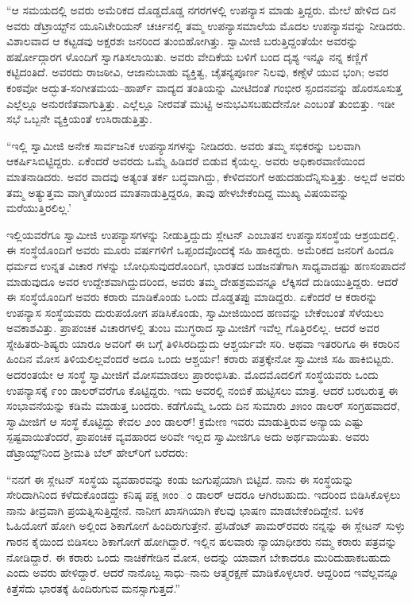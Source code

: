 “ಆ ಸಮಯದಲ್ಲಿ ಅವರು ಅಮೆರಿಕದ ದೊಡ್ಡದೊಡ್ಡ ನಗರಗಳಲ್ಲಿ ಉಪನ್ಯಾಸ ಮಾಡು ತ್ತಿದ್ದರು. ಮೇಲೆ ಹೇಳಿದ ದಿನ ಅವರು ಡೆಟ್ರಾಯ್ಟ್​ನ ಯೂನಿಟೇರಿಯನ್ ಚರ್ಚಿನಲ್ಲಿ ತಮ್ಮ ಉಪನ್ಯಾಸಮಾಲೆಯ ಮೊದಲ ಉಪನ್ಯಾಸವನ್ನು ನೀಡಿದರು. ವಿಶಾಲವಾದ ಆ ಕಟ್ಟಡವು ಅಕ್ಷರಶಃ ಜನರಿಂದ ತುಂಬಿಹೋಗಿತ್ತು. ಸ್ವಾಮೀಜಿ ಬರುತ್ತಿದ್ದಂತೆಯೇ ಅವರನ್ನು ಹರ್ಷೋದ್ಗಾರಗ ಳೊಂದಿಗೆ ಸ್ವಾಗತಿಸಲಾಯಿತು. ಅವರು ವೇದಿಕೆಯ ಬಳಿಗೆ ಬಂದ ದೃಶ್ಯ ಇನ್ನೂ ನನ್ನ ಕಣ್ಣಿಗೆ ಕಟ್ಟಿದಂತಿದೆ. ಅವರದು ರಾಜಠೀವಿ, ಆಜಾನುಬಾಹು ವ್ಯಕ್ತಿತ್ವ, ಚೈತನ್ಯಪೂರ್ಣ ನಿಲವು, ಕಣ್ಸೆಳೆ ಯುವ ಭಂಗಿ; ಅವರ ಕಂಠವೋ ಅದ್ಭುತ-ಸಂಗೀತಮಯ–ಹಾರ್ಪ್ ವಾದ್ಯದ ತಂತಿಯನ್ನು ಮೀಟಿದಂತೆ ಗಂಭೀರ ಸ್ಪಂದನವನ್ನು ಹೊರಸೂಸುತ್ತ ಎಲ್ಲೆಲ್ಲೂ ಅನುರಣಿತವಾಗುತ್ತಿತ್ತು. ಎಲ್ಲೆಲ್ಲೂ ನೀರವತೆ ಮುಟ್ಟಿ ಅನುಭವಿಸಬಹುದೇನೋ ಎಂಬಂತೆ ತುಂಬಿತ್ತು. ಇಡೀ ಸಭೆ ಒಬ್ಬನೇ ವ್ಯಕ್ತಿಯಂತೆ ಉಸಿರಾಡುತ್ತಿತ್ತು.

“ಇಲ್ಲಿ ಸ್ವಾಮೀಜಿ ಅನೇಕ ಸಾರ್ವಜನಿಕ ಉಪನ್ಯಾಸಗಳನ್ನು ನೀಡಿದರು. ಅವರು ತಮ್ಮ ಸಭಿಕರನ್ನು ಬಲವಾಗಿ ಆಕರ್ಷಿಸಿಬಿಟ್ಟಿದ್ದರು. ಏಕೆಂದರೆ ಅವರದು ಒಮ್ಮೆ ಹಿಡಿದರೆ ಬಿಡುವ ಕೈಯಲ್ಲ. ಅವರು ಅಧಿಕಾರವಾಣಿಯಿಂದ ಮಾತನಾಡಿದರು. ಅವರ ವಾದವು ಅತ್ಯಂತ ತರ್ಕ ಬದ್ಧವಾಗಿದ್ದು, ಕೇಳಿದವರಿಗೆ ಅಹುದಹುದೆನ್ನಿಸುತ್ತಿತ್ತು. ಅಲ್ಲದೆ ಅವರು ತಮ್ಮ ಅತ್ಯುತ್ತಮ ವಾಗ್ಮಿತೆಯಿಂದ ಮಾತನಾಡುತ್ತಿದ್ದರೂ, ತಾವು ಹೇಳಬೇಕೆಂದಿದ್ದ ಮುಖ್ಯ ವಿಷಯವನ್ನು ಮರೆಯುತ್ತಿರಲಿಲ್ಲ.’

ಇಲ್ಲಿಯವರೆಗೂ ಸ್ವಾಮೀಜಿ ಉಪನ್ಯಾಸಗಳನ್ನು ನೀಡುತ್ತಿದ್ದುದು ಸ್ಲೇಟನ್ ಎಂಬಾತನ ಉಪನ್ಯಾಸಸಂಸ್ಥೆಯ ಆಶ್ರಯದಲ್ಲಿ. ಈ ಸಂಸ್ಥೆಯೊಂದಿಗೆ ಅವರು ಮೂರು ವರ್ಷಗಳಿಗೆ ಒಪ್ಪಂದವೊಂದಕ್ಕೆ ಸಹಿ ಹಾಕಿದ್ದರು. ಅಮೆರಿಕದ ಜನರಿಗೆ ಹಿಂದೂ ಧರ್ಮದ ಉನ್ನತ ವಿಚಾರ ಗಳನ್ನು ಬೋಧಿಸುವುದರೊಂದಿಗೆ, ಭಾರತದ ಬಡಜನತೆಗಾಗಿ ಸಾಧ್ಯವಾದಷ್ಟು ಹಣಸಂಪಾದನೆ ಮಾಡುವುದೂ ಅವರ ಉದ್ದೇಶವಾಗಿದ್ದುದರಿಂದ, ಅವರು ತಮ್ಮ ದೇಹಶ್ರಮವನ್ನೂ ಲೆಕ್ಕಿಸದೆ ದುಡಿಯುತ್ತಿದ್ದರು. ಆದರೆ ಈ ಸಂಸ್ಥೆಯೊಂದಿಗೆ ಅವರು ಕರಾರು ಮಾಡಿಕೊಂಡು ಒಂದು ದೊಡ್ಡತಪ್ಪು ಮಾಡಿದ್ದರು. ಏಕೆಂದರೆ ಆ ಕರಾರನ್ನು ಉಪನ್ಯಾಸ ಸಂಸ್ಥೆಯವರು ದುರುಪಯೋಗ ಪಡಿಸಿಕೊಂಡು, ಸ್ವಾಮೀಜಿಯಿಂದ ಹಣವನ್ನು ಬೇಕೆಂಬಂತೆ ಸೆಳೆಯಲು ಅವಕಾಶವಿತ್ತು. ಪ್ರಾಪಂಚಿಕ ವಿಚಾರಗಳಲ್ಲಿ ತುಂಬ ಮುಗ್ಧರಾದ ಸ್ವಾಮೀಜಿಗೆ ಇವೆಲ್ಲ ಗೊತ್ತಿರಲಿಲ್ಲ. ಆದರೆ ಅವರ ಸ್ನೇಹಿತರು-ಶಿಷ್ಯರು ಯಾರೂ ಅವರಿಗೆ ಈ ಬಗ್ಗೆ ತಿಳಿಸಿರದಿದ್ದುದು ಆಶ್ಚರ್ಯವೇ ಸರಿ. ಅಥವಾ ಇತರರಿಗೂ ಈ ಕರಾರಿನ ಹಿಂದಿನ ಮೋಸ ತಿಳಿಯಲಿಲ್ಲವೆಂದರೆ ಅದೂ ಒಂದು ಆಶ್ಚರ್ಯ! ಕರಾರು ಪತ್ರಕ್ಕೇನೋ ಸ್ವಾಮೀಜಿ ಸಹಿ ಹಾಕಿಬಿಟ್ಟರು. ಅದರಂತಯೇ ಆ ಸಂಸ್ಥೆ ಸ್ವಾಮೀಜಿಗೆ ಮೋಸಮಾಡಲು ಪ್ರಾರಂಭಿಸಿತು. ಮೊದಮೊದಲಿಗೆ ಸಂಸ್ಥೆಯವರು ಒಂದು ಉಪನ್ಯಾಸಕ್ಕೆ ೯ಂಂ ಡಾಲರ್​ವರೆಗೂ ಕೊಟ್ಟಿದ್ದರು. ಇದು ಅವರಲ್ಲಿ ನಂಬಿಕೆ ಹುಟ್ಟಿಸಲು ಮಾತ್ರ. ಆದರೆ ಬರಬರುತ್ತ ಈ ಸಂಭಾವನೆಯನ್ನು ಕಡಿಮೆ ಮಾಡುತ್ತ ಬಂದರು. ಕಡೆಗೊಮ್ಮೆ ಒಂದು ದಿನ ಸುಮಾರು ೨೫ಂಂ ಡಾಲರ್ ಸಂಗ್ರಹವಾದರೆ, ಸ್ವಾಮೀಜಿಗೆ ಆ ಸಂಸ್ಥೆ ಕೊಟ್ಟಿದ್ದು ಕೇವಲ ೨ಂಂ ಡಾಲರ್! ಕ್ರಮೇಣ ಇವರು ಮಾಡುತ್ತಿರುವ ಅನ್ಯಾಯ ಎಷ್ಟು ಸ್ಪಷ್ಟವಾಯಿತೆಂದರೆ, ಪ್ರಾಪಂಚಿಕ ವ್ಯವಹಾರದ ಅರಿವೇ ಇಲ್ಲದ ಸ್ವಾಮೀಜಿಗೂ ಅದು ಅರ್ಥವಾಯಿತು. ಅವರು ಡೆಟ್ರಾಯ್ಟ್​ನಿಂದ ಶ್ರೀಮತಿ ಬೆಲ್ ಹೇಲ್​ರಿಗೆ ಬರೆದರು:

“ನನಗೆ ಈ ಸ್ಲೇಟನ್ ಸಂಸ್ಥೆಯ ವ್ಯವಹಾರವನ್ನು ಕಂಡು ಜುಗುಪ್ಸೆಯಾಗಿ ಬಿಟ್ಟಿದೆ. ನಾನು ಈ ಸಂಸ್ಥೆಯನ್ನು ಸೇರಿದಾಗಿನಿಂದ ಕಳೆದುಕೊಂಡದ್ದು ಕನಿಷ್ಠ ಪಕ್ಷ ೫ಂಂಂ ಡಾಲರ್ ಆದರೂ ಆಗಿರಬಹುದು. ಇದರಿಂದ ಬಿಡಿಸಿಕೊಳ್ಳಲು ನಾನು ತೀವ್ರವಾಗಿ ಪ್ರಯತ್ನಿಸುತ್ತಿದ್ದೇನೆ. ನಾನೀಗ ಖಾಸಗಿಯಾಗಿ ಕೆಲವು ಭಾಷಣ ಮಾಡಬೇಕೆಂದಿದ್ದೇನೆ. ಬಳಿಕ ಓಹಿಯೋಗೆ ಹೋಗಿ ಅಲ್ಲಿಂದ ಶಿಕಾಗೋಗೆ ಹಿಂದಿರುಗುತ್ತೇನೆ. ಪ್ರೆಸಿಡೆಂಟ್ ಪಾಮರ್​ರವರು ನನ್ನನ್ನು ಈ ಸ್ಲೇಟನ್ ಸುಳ್ಳು ಗಾರನ ಕೈಯಿಂದ ಬಿಡಿಸಲು ಶಿಕಾಗೋಗೆ ಹೋಗಿದ್ದಾರೆ. ಇಲ್ಲಿನ ಹಲವಾರು ನ್ಯಾಯಾಧೀಶರು ನಮ್ಮ ಕರಾರು ಪತ್ರವನ್ನು ನೋಡಿದ್ದಾರೆ. ಈ ಕರಾರು ಒಂದು ನಾಚಿಕೆಗೇಡಿನ ಮೋಸ, ಅದನ್ನು ಯಾವಾಗ ಬೇಕಾದರೂ ಮುರಿದುಹಾಕಬಹುದು ಎಂದು ಅವರು ಹೇಳಿದ್ದಾರೆ. ಆದರೆ ನಾನೊಬ್ಬ ಸಾಧು–ನಾನು ಆತ್ಮರಕ್ಷಣೆ ಮಾಡಿಕೊಳ್ಳಲಾರೆ. ಆದ್ದರಿಂದ ಇವೆಲ್ಲವನ್ನೂ ಕಿತ್ತೆಸೆದು ಭಾರತಕ್ಕೆ ಹಿಂದಿರುಗುವ ಮನಸ್ಸಾಗುತ್ತದೆ.”

